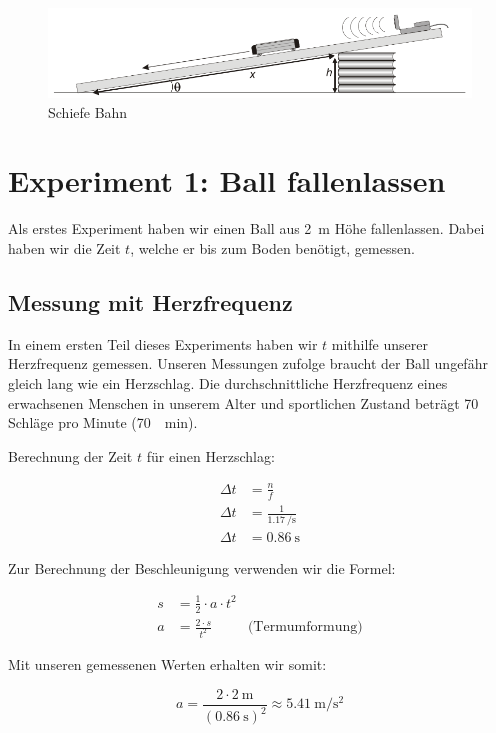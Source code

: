 \documentclass[a4paper, titlepage]{article}
\newcommand{\accunit}[1]{\SI{#1}{\metre\per\square\second}}
\begin{document}
    \begin{figure}
        \includegraphics[width=\textwidth]{images/incline.png}
        \caption{Schiefe Bahn}
        \label{incline}
    \end{figure}

    \section{Experiment 1: Ball fallenlassen}
    Als erstes Experiment haben wir einen Ball aus \SI{2}{\metre} Höhe
    fallenlassen. Dabei haben wir die Zeit $t$, welche er bis zum Boden
    benötigt, gemessen.
    \subsection{Messung mit Herzfrequenz}
    In einem ersten Teil dieses Experiments haben wir $t$
    mithilfe unserer Herzfrequenz gemessen.
    Unseren Messungen zufolge
    braucht der Ball ungefähr gleich lang wie ein Herzschlag. Die
    durchschnittliche Herzfrequenz eines erwachsenen Menschen in unserem
    Alter und sportlichen Zustand beträgt 70 Schläge pro Minute (\SI{70}{\per\minute}).

    Berechnung der Zeit $t$ für einen Herzschlag:
    
    \begin{align}
        \Delta t &= \frac{n}{f} \\
        \Delta t &= \frac{1}{\SI{1.17}{\per\second}} \\
        \Delta t &= \SI{0.86}{\second}
    \end{align}

    Zur Berechnung der Beschleunigung verwenden wir
    die Formel:

    \begin{align}
        s &= \frac{1}{2} \cdot a \cdot t^2 \\
        a &= \frac{2 \cdot s}{t^2} & \text{(Termumformung)} \label{ast}
    \end{align}

    Mit unseren gemessenen Werten erhalten wir somit:

    \begin{equation}
        a = \frac{2 \cdot \SI{2}{\metre}}{(\SI{0.86}{\second})^2}
        \approx \accunit{5.41}
    \end{equation}
\end{document}
